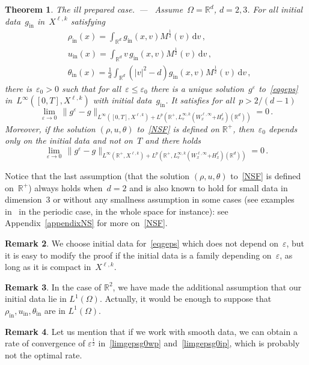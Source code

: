 \documentclass[11pt]{article}
\newtheorem{theo}{Theorem}[section]
\theoremstyle{definition}
\newtheorem{rema}[theo]{Remark}
\newcommand{\pointir}{.\ ---\ }
\numberwithin{equation}{section}
\numberwithin{figure}{section}
\numberwithin{table}{section}
\newcommand*{\dd}{\mathrm{d}}
\newcommand*{\dv}{\dd v}
\newcommand*\R {\mathbb{R}}
\newcommand*\eps{{\varepsilon}}
\newcommand*\e{{\varepsilon}}
\DeclareMathOperator{\inn}{in}
\begin{document}
\begin{theo}
\smallskip
\emph{The ill prepared case}\pointir
Assume~$\Omega = \R^d$, $d= 2,3$. For all initial data~$g_{\inn}$ in~$X^{\ell,k}$ satisfying
\begin{align*}
&\rho_{\inn}(x)= \int_{\R^d} g_{\inn} (x,v)M^\frac12 (v) \, \dv \,,\\
&u_{\inn} (x)= \int_{\R^d} v\, g_{\inn} (x,v)M^\frac12 (v) \, \dv\,, \\
&\theta_{\inn} (x)= \frac{1}{d} \int_{\R^d} (|v|^2-d) g_{\inn} (x,v)M^\frac12 (v) \, \dv \,,
\end{align*}
there is~$\e_0>0$ such that for all~$\e\leq \e_0$ there is a unique solution~$g^\e$ to~\eqref{eqgeps} in~{$L^\infty([0,T],X^{\ell,k})$} with initial data~$g_{\inn}$. It satisfies for all~$p>2/(d-1)$
\begin{equation}\label{limgepsg0ip}
\lim_{\eps\to 0} \, \big\| g^\eps-g
\big\|_{L^\infty([0,T],X^{\ell,k}) + {L^p(\R^+,L^{\infty,k}_v(W^{\ell,\infty}_x{+ H^\ell_x})(\R^d))}} = 0 \,.
\end{equation}
Moreover, if the solution $(\rho,u,\theta)$ to~\eqref{NSF} is defined on $\R^+$, then~$\eps_0$ depends only on the initial data and not on~$T$ and there holds
\[
\lim_{\eps\to 0} \, \big\| g^\eps-g
\big\|_{L^\infty(\R^+,X^{\ell,k}) +L^p(\R^+,L^{\infty,k}_v(W^{\ell,\infty}_x{+ H^\ell_x})(\R^d)) }= 0 \,.
\]
\end{theo}
Notice that the last assumption (that the solution $(\rho,u,\theta)$ to~\eqref{NSF} is defined on~$\R^+$) always holds when~$d=2$ and is also known to hold for small data in dimension~3 or without any smallness assumption in some cases (see examples in~\cite{cg1} in the periodic case, \cite{cg} in the whole space for instance): see Appendix~\ref{appendixNS} for more on~\eqref{NSF}.
\begin{rema}
We choose initial data for~\eqref{eqgeps} which does not depend on~$\eps$, but it is easy to modify the proof if the initial data is a family depending on~$\eps$, as long as it is compact in~$X^{\ell,k}$.
\end{rema}
\begin{rema}
In the case of $\R^2$, we have made the additional assumption that our initial data lie in $L^1(\Omega)$. Actually, it would be enough to suppose that $\rho_{\inn}, u_{\inn}, \theta_{\inn} $ are in $L^1(\Omega)$.
\end{rema}
\begin{rema}
Let us mention that if we work with smooth data, we can obtain a rate of convergence of $\eps^\frac12$ in~\eqref{limgepsg0wp} and~\eqref{limgepsg0ip}, which is probably not the optimal rate.
\end{rema}
\end{document}
